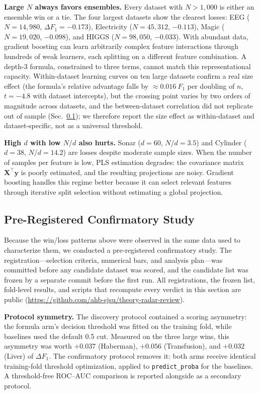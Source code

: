 \documentclass[journal]{IEEEtran}
\begin{document}
\textbf{Large $N$ always favors ensembles.}
Every dataset with $N > 1{,}000$ is either an ensemble win or a tie.
The four largest datasets show the clearest losses: EEG
($N = 14{,}980$, $\Delta F_1 = -0.173$), Electricity
($N = 45{,}312$, $-0.113$), Magic ($N = 19{,}020$, $-0.098$), and
HIGGS ($N = 98{,}050$, $-0.033$).  With abundant data, gradient
boosting can learn arbitrarily complex feature interactions through
hundreds of weak learners, each splitting on a different feature
combination.  A depth-3 formula, constrained to three terms, cannot
match this representational capacity.  Within-dataset learning
curves on ten large datasets confirm a real size effect
(the formula's relative advantage falls by ${\approx}0.016\ F_1$
per doubling of $n$, $t = -4.8$ with dataset intercepts), but the
crossing point varies by two orders of magnitude across datasets,
and the between-dataset correlation did not replicate out of
sample (Sec.~\ref{sec:confirmatory}); we therefore report the
size effect as within-dataset and dataset-specific, not as a
universal threshold.

\textbf{High $d$ with low $N/d$ also hurts.}
Sonar ($d = 60$, $N/d = 3.5$) and Cylinder ($d = 38$, $N/d = 14.2$)
are losses despite moderate sample sizes.  When the number of
samples per feature is low, PLS estimation degrades: the covariance
matrix $\mathbf{X}^\top \mathbf{y}$ is poorly estimated, and the
resulting projections are noisy.  Gradient boosting handles this
regime better because it can select relevant features through
iterative split selection without estimating a global projection.

\subsection{Pre-Registered Confirmatory Study}
\label{sec:confirmatory}

Because the win/loss patterns above were observed in the same data
used to characterize them, we conducted a pre-registered
confirmatory study.  The registration---selection criteria,
numerical bars, and analysis plan---was committed before any
candidate dataset was scored, and the candidate list was frozen by
a separate commit before the first run.
All registrations, the frozen list, fold-level results, and scripts
that recompute every verdict in this section are public
(\url{https://github.com/ahb-sjsu/theory-radar-review}).

\textbf{Protocol symmetry.}  The discovery protocol contained a
scoring asymmetry: the formula arm's decision threshold was fitted
on the training fold, while baselines used the default 0.5 cut.
Measured on the three large wins, this asymmetry was worth
${+}0.037$ (Haberman), ${+}0.056$ (Transfusion), and ${+}0.032$
(Liver) of $\Delta F_1$.  The confirmatory protocol removes it:
both arms receive identical training-fold threshold optimization,
applied to \texttt{predict\_proba} for the baselines.  A
threshold-free ROC--AUC comparison is reported alongside as a
secondary protocol.
\end{document}

